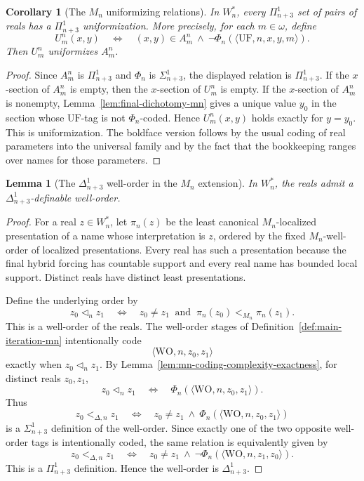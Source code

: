 \documentclass[a4paper,11pt]{article}
\newtheorem{lemma}[theorem]{Lemma}
\newtheorem{corollary}[theorem]{Corollary}
\begin{document}
\begin{corollary}[The $M_n$ uniformizing relations]\label{cor:final-pin3-uniformization-mn}
In $W_n^\ast$, every $\Pi^1_{n+3}$ set of pairs of reals has a $\Pi^1_{n+3}$ uniformization.  More precisely, for each $m\in\omega$, define
\[
   U^n_m(x,y)
   \quad\Longleftrightarrow\quad
   (x,y)\in A^n_m\ \land\
   \neg\Phi_n(\langle\mathrm{UF},n,x,y,m\rangle).
\]
Then $U^n_m$ uniformizes $A^n_m$.
\end{corollary}

\begin{proof}
Since $A^n_m$ is $\Pi^1_{n+3}$ and $\Phi_n$ is $\Sigma^1_{n+3}$, the displayed relation is $\Pi^1_{n+3}$.  If the $x$-section of $A^n_m$ is empty, then the $x$-section of $U^n_m$ is empty.  If the $x$-section of $A^n_m$ is nonempty, Lemma~\ref{lem:final-dichotomy-mn} gives a unique value $y_0$ in the section whose $\mathrm{UF}$-tag is not $\Phi_n$-coded.  Hence $U^n_m(x,y)$ holds exactly for $y=y_0$.  This is uniformization.  The boldface version follows by the usual coding of real parameters into the universal family and by the fact that the bookkeeping ranges over names for those parameters.
\end{proof}

\begin{lemma}[The $\Delta^1_{n+3}$ well-order in the $M_n$ extension]\label{lem:final-deltan3-wellorder-mn}
In $W_n^\ast$, the reals admit a $\Delta^1_{n+3}$-definable well-order.
\end{lemma}

\begin{proof}
For a real $z\in W_n^\ast$, let $\pi_n(z)$ be the least canonical $M_n$-localized presentation of a name whose interpretation is $z$, ordered by the fixed $M_n$-well-order of localized presentations.  Every real has such a presentation because the final hybrid forcing has countable support and every real name has bounded local support.  Distinct reals have distinct least presentations.

Define the underlying order by
\[
   z_0\triangleleft_n z_1
   \quad\Longleftrightarrow\quad
   z_0\neq z_1\ \text{ and }\ \pi_n(z_0)<_{M_n}\pi_n(z_1).
\]
This is a well-order of the reals.  The well-order stages of Definition~\ref{def:main-iteration-mn} intentionally code
\[
   \langle\mathrm{WO},n,z_0,z_1\rangle
\]
exactly when $z_0\triangleleft_n z_1$.  By Lemma~\ref{lem:mn-coding-complexity-exactness}, for distinct reals $z_0,z_1$,
\[
   z_0\triangleleft_n z_1
   \quad\Longleftrightarrow\quad
   \Phi_n(\langle\mathrm{WO},n,z_0,z_1\rangle).
\]
Thus
\[
   z_0<_{\Delta,n}z_1
   \quad\Longleftrightarrow\quad
   z_0\neq z_1\ \land\
   \Phi_n(\langle\mathrm{WO},n,z_0,z_1\rangle)
\]
is a $\Sigma^1_{n+3}$ definition of the well-order.  Since exactly one of the two opposite well-order tags is intentionally coded, the same relation is equivalently given by
\[
   z_0<_{\Delta,n}z_1
   \quad\Longleftrightarrow\quad
   z_0\neq z_1\ \land\
   \neg\Phi_n(\langle\mathrm{WO},n,z_1,z_0\rangle).
\]
This is a $\Pi^1_{n+3}$ definition.  Hence the well-order is $\Delta^1_{n+3}$.
\end{proof}
\end{document}
